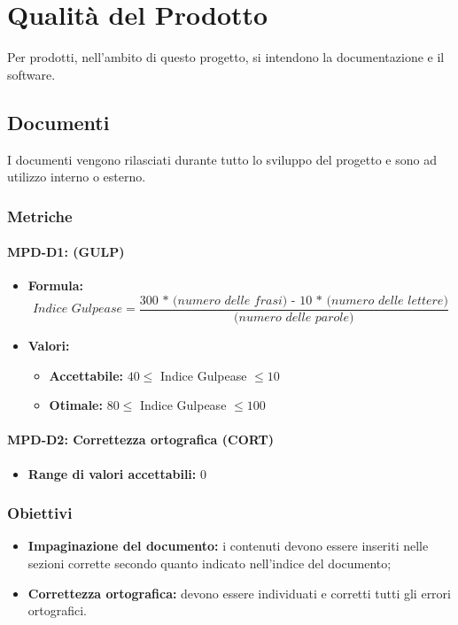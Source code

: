 \section{Qualità del Prodotto} \label{_qualitaProdotto}
Per prodotti, nell'ambito di questo progetto, si intendono la documentazione e il software.

\subsection{Documenti}\label{_documenti}
I documenti vengono rilasciati durante tutto lo sviluppo del progetto e sono ad utilizzo interno o esterno.

\subsubsection{Metriche}

 
    \paragraph{MPD-D1:  (GULP)}
\begin{itemize}
\item \textbf{Formula:} \[\textit{Indice Gulpease} = \frac{\textit{300 * (numero delle frasi) - 10 * (numero delle lettere)}}{\textit{(numero delle parole)}}\]
\item \textbf{Valori:}
    \begin{itemize}
        \item \textbf{Accettabile:} $40 \leq$ Indice Gulpease $\leq 10$
        \item \textbf{Otimale:} $80 \leq$ Indice Gulpease $\leq 100$
    \end{itemize}

   
\end{itemize}

\paragraph{MPD-D2: Correttezza ortografica (CORT)}
\begin{itemize}
    \item  \textbf{Range di valori accettabili:} 0
\end{itemize}

\subsubsection{Obiettivi}
\begin{itemize}
    \item \textbf{Impaginazione del documento:} i contenuti devono essere inseriti nelle sezioni corrette secondo quanto indicato nell'indice del documento;
    \item \textbf{Correttezza ortografica:} devono essere individuati e corretti tutti gli errori ortografici.
\end{itemize}

